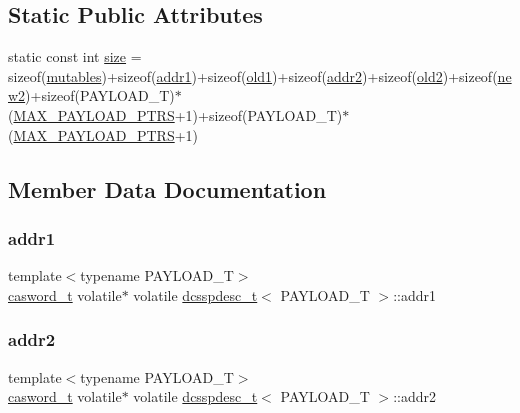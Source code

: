\subsection*{Static Public Attributes}
\begin{DoxyCompactItemize}
\item 
static const int \hyperlink{classdcsspdesc__t_a29649c162a785ff33c3fb6967a9838f7}{size} = sizeof(\hyperlink{classdcsspdesc__t_a0c377eb0bb0ca80e67bfdb958bc154a3}{mutables})+sizeof(\hyperlink{classdcsspdesc__t_a07f31abfd3e37e000c9335420843538a}{addr1})+sizeof(\hyperlink{classdcsspdesc__t_ae4e128e33e5819e8df288c149ad6a9c2}{old1})+sizeof(\hyperlink{classdcsspdesc__t_ae7f0547246e681d570349d653999d04a}{addr2})+sizeof(\hyperlink{classdcsspdesc__t_a898e3c1a51fff0a73c484b1f3ed2fc49}{old2})+sizeof(\hyperlink{classdcsspdesc__t_a26e12bf581a9cf3b5007d6affed2d944}{new2})+sizeof(P\+A\+Y\+L\+O\+A\+D\+\_\+T)$\ast$(\hyperlink{dcss__plus_8h_af06e916cb13168b5e10308a196165616}{M\+A\+X\+\_\+\+P\+A\+Y\+L\+O\+A\+D\+\_\+\+P\+T\+RS}+1)+sizeof(P\+A\+Y\+L\+O\+A\+D\+\_\+T)$\ast$(\hyperlink{dcss__plus_8h_af06e916cb13168b5e10308a196165616}{M\+A\+X\+\_\+\+P\+A\+Y\+L\+O\+A\+D\+\_\+\+P\+T\+RS}+1)
\end{DoxyCompactItemize}


\subsection{Member Data Documentation}
\mbox{\label{classdcsspdesc__t_a07f31abfd3e37e000c9335420843538a}} 
\subsubsection{\texorpdfstring{addr1}{addr1}}
{\footnotesize\ttfamily template$<$typename P\+A\+Y\+L\+O\+A\+D\+\_\+T$>$ \\
\hyperlink{rq__unsafe_8h_ad45142aaf2ff20a036dc6242b8483e9c}{casword\+\_\+t} volatile$\ast$ volatile \hyperlink{classdcsspdesc__t}{dcsspdesc\+\_\+t}$<$ P\+A\+Y\+L\+O\+A\+D\+\_\+T $>$\+::addr1}

\mbox{\label{classdcsspdesc__t_ae7f0547246e681d570349d653999d04a}} 
\subsubsection{\texorpdfstring{addr2}{addr2}}
{\footnotesize\ttfamily template$<$typename P\+A\+Y\+L\+O\+A\+D\+\_\+T$>$ \\
\hyperlink{rq__unsafe_8h_ad45142aaf2ff20a036dc6242b8483e9c}{casword\+\_\+t} volatile$\ast$ volatile \hyperlink{classdcsspdesc__t}{dcsspdesc\+\_\+t}$<$ P\+A\+Y\+L\+O\+A\+D\+\_\+T $>$\+::addr2}

